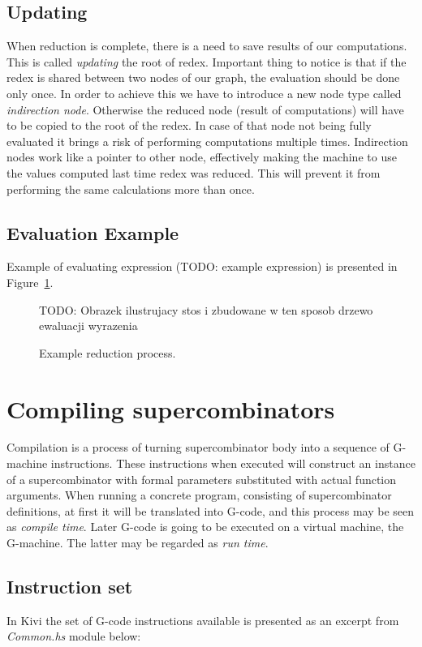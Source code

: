 \documentclass[12pt,a4paper]{report}
\begin{document}
\subsection{Updating}
\label{sec:updating}
When reduction is complete, there is a need to save results of our
computations. This is called \textit{updating} the root of redex. Important
thing to notice is that if the redex is shared between two nodes of our graph,
the evaluation should be done only once. In order to achieve this we have to
introduce a new node type called \textit{indirection node}. Otherwise the
reduced node (result of computations) will have to be copied to the root of
the redex. In case of that node not being fully evaluated it brings a risk of
performing computations multiple times. Indirection nodes work like a pointer
to other node, effectively making the machine to use the values computed last
time redex was reduced. This will prevent it from performing the same
calculations more than once.

\subsection{Evaluation Example}
Example of evaluating expression (TODO: example expression) is presented
in Figure~\ref{fig:example_reduction}.

\begin{figure}[h!]
  \centering

  TODO: Obrazek ilustrujacy stos i zbudowane w ten sposob drzewo ewaluacji
  wyrazenia

  \caption{Example reduction process.}
  \label{fig:example_reduction}
\end{figure}

\section{Compiling supercombinators}
Compilation is a process of turning supercombinator body into a sequence of
G-machine instructions. These instructions when executed will construct an
instance of a supercombinator with formal parameters substituted with actual
function arguments. When running a concrete program, consisting of
supercombinator definitions, at first it will be translated into G-code, and this
process may be seen as \textit{compile time}. Later G-code is going to be
executed on a virtual machine, the G-machine. The latter may be regarded as
\textit{run time}.


\subsection{Instruction set}
In Kivi the set of G-code instructions available is presented as an excerpt
from \textit{Common.hs} module below:
\end{document}
